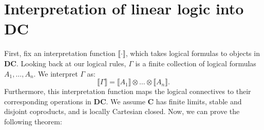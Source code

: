 \documentclass[a4paper]{article}
\newcommand{\DC}{\textbf{DC}}
\newcommand{\C}{\textbf{C}}
\newcommand{\denot}[1]{\llbracket {#1} \rrbracket}
\begin{document}
\section{Interpretation of linear logic into DC}

First, fix an interpretation function $\denot{\cdot}$, which takes logical formulas to objects in \DC.
Looking back at our logical rules, $\Gamma$ is a finite collection of logical formulas $A_1,\dots,A_n$. We interpret $\Gamma$ as:
\begin{equation*}
    \denot\Gamma=\denot{A_1}\otimes\dots\otimes\denot{A_n}.
\end{equation*}
Furthermore, this interpretation function maps the logical connectives to their corresponding operations in \DC. We assume \C{} has finite limits, stable and disjoint coproducts, and is locally Cartesian closed. Now, we can prove the following theorem:
\end{document}
